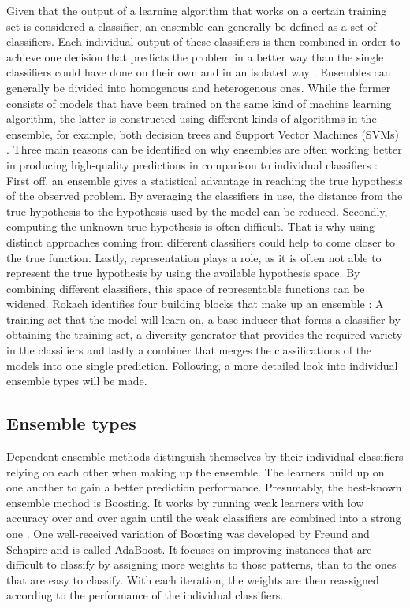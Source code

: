 Given that the output of a learning algorithm that works on a certain training set is considered a classifier, an ensemble can generally be defined as a set of classifiers. Each individual output of these classifiers is then combined in order to achieve one decision that predicts the problem in a better way than the single classifiers could have done on their own and in an isolated way \cite{dietterich2000}. Ensembles can generally be divided into homogenous and heterogenous ones. While the former consists of models that have been trained on the same kind of machine learning algorithm, the latter is constructed using different kinds of algorithms in the ensemble, for example, both decision trees and Support Vector Machines (SVMs) \cite{zhou2012}. Three main reasons can be identified on why ensembles are often working better in producing high-quality predictions in comparison to individual classifiers \cite{dietterich2000}: First off, an ensemble gives a statistical advantage in reaching the true hypothesis of the observed problem. By averaging the classifiers in use, the distance from the true hypothesis to the hypothesis used by the model can be reduced. Secondly, computing the unknown true hypothesis is often difficult. That is why using distinct approaches coming from different classifiers could help to come closer to the true function. Lastly, representation plays a role, as it is often not able to represent the true hypothesis by using the available hypothesis space. By combining different classifiers, this space of representable functions can be widened. Rokach identifies four building blocks that make up an ensemble \cite{rokach2010}: A training set that the model will learn on, a base inducer that forms a classifier by obtaining the training set, a diversity generator that provides the required variety in the classifiers and lastly a combiner that merges the classifications of the models into one single prediction. Following, a more detailed look into individual ensemble types will be made.



\subsection{Ensemble types}

Dependent ensemble methods distinguish themselves by their individual classifiers relying on each other when making up the ensemble. The learners build up on one another to gain a better prediction performance. Presumably, the best-known ensemble method is Boosting. It works by running weak learners with low accuracy over and over again until the weak classifiers are combined into a strong one \cite{rokach2010}. One well-received variation of Boosting was developed by Freund and Schapire \cite{freund1995} and is called AdaBoost. It focuses on improving instances that are difficult to classify by assigning more weights to those patterns, than to the ones that are easy to classify. With each iteration, the weights are then reassigned according to the performance of the individual classifiers.


